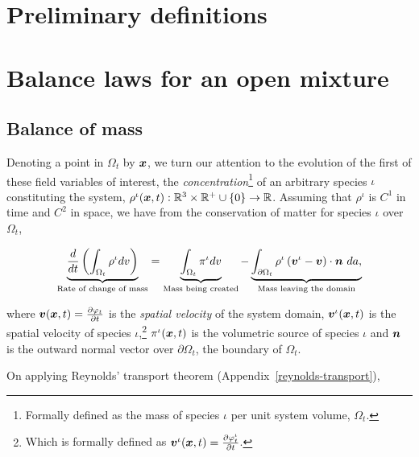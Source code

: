 \section{Preliminary definitions}
\label{eu-preliminary-definitions}

\section{Balance laws for an open mixture}
\label{eu-balance-laws}
                                   
\subsection{Balance of mass}
\label{eu-balance-of-mass}

Denoting a point in $\Omega_{t}$ by $\mbox{\boldmath$ x$}$, we turn our attention to
the evolution of the first of these field variables of interest, the
{\em concentration}\footnote{Formally defined as the mass of species
  $\iota$ per unit system volume, $\Omega_{t}$.} of an arbitrary
species $\iota$ constituting the system, $\rho^{\iota}(\mbox{\boldmath$ x$},t):
\mathbb{R}^3\times\mathbb{R}^{+}\cup\{0\} \rightarrow
\mathbb{R}$. Assuming that $\rho^{\iota}$ is {\color{Blue}
  $\mathit{C}^{1}$} in time and {\color{Blue} $\mathit{C}^{2}$} in
space, we have from the conservation of matter for species $\iota$
over $\Omega_{t}$,


\begin{equation}
\underbrace{\frac{d}{dt}\left(\int_{\Omega_{t}} \rho^{\iota} dv
  \right)}_{\text{Rate of change of mass}} = 
 \underbrace{\int_{\Omega_{t}}
  \pi^{\iota} dv}_{\text{Mass being created}}
- \underbrace{\int_{\partial \Omega_{t}} \rho^{\iota}
  \left(\bv^{\iota} - \bv\right) \cdot \bn\ 
da,}_{\text{Mass leaving the domain}}
\label{globalbalanceofmass}
\end{equation}

 where $\mbox{\boldmath$ v$}(\mbox{\boldmath$ x$},t) = \frac{\partial \varphi_{t}}{\partial t}$
is the {\em spatial velocity} of the system domain,
$\mbox{\boldmath$ v$}^{\iota}(\mbox{\boldmath$ x$},t)$ is the spatial velocity of species
$\iota$,\footnote{Which is formally defined as $\mbox{\boldmath$ v$}^{\iota}(\mbox{\boldmath$ x$},t) =
  \frac{\partial \varphi^{\iota}_{t}}{\partial t}$.} %
 $\pi^{\iota}(\mbox{\boldmath$ x$},t)$ is the volumetric source of species $\iota$ and
$\mbox{\boldmath$ n$}$ is the outward normal vector over $\partial \Omega_{t}$, the
boundary of $\Omega_{t}$.

On applying Reynolds' transport theorem (Appendix~\ref{reynolds-transport}),

